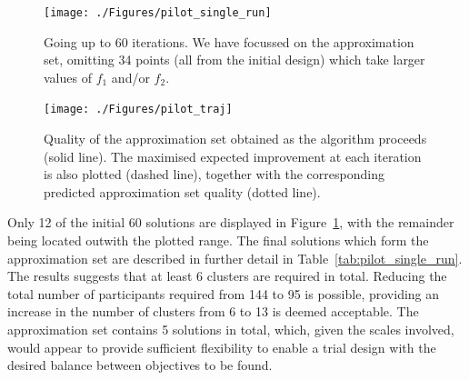\documentclass{article} %
\begin{document}
\begin{figure}
\centering
\texttt{[image: ./Figures/pilot\_single\_run]}
\caption{Going up to 60 iterations. We have focussed on the approximation set, omitting 34 points (all from the initial design) which take larger values of $f_{1}$ and/or $f_{2}$. }
\label{fig:pilot_single_run}
\end{figure}

\begin{figure}
\centering
\texttt{[image: ./Figures/pilot\_traj]}
\caption{Quality of the approximation set obtained as the algorithm proceeds (solid line). The maximised expected improvement at each iteration is also plotted (dashed line), together with the corresponding predicted approximation set quality (dotted line).}
\label{fig:pilot_traj}
\end{figure}

Only 12 of the initial 60 solutions are displayed in Figure~\ref{fig:pilot_single_run}, with the remainder being located outwith the plotted range. The final solutions which form the approximation set are described in further detail in Table~\ref{tab:pilot_single_run}. The results suggests that at least 6 clusters are required in total. Reducing the total number of participants required from 144 to 95 is possible, providing an increase in the number of clusters from 6 to 13 is deemed acceptable. The approximation set contains 5 solutions in total, which, given the scales involved, would appear to provide sufficient flexibility to enable a trial design with the desired balance between objectives to be found.
\end{document}
